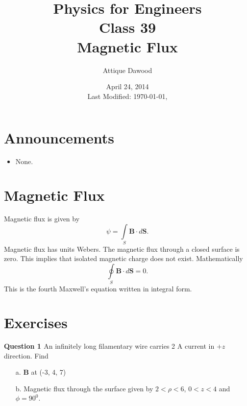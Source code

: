 \documentclass[12pt,a4paper]{article}
\title{\vspace{-3cm}Physics for Engineers\\Class 39\\Magnetic Flux}
\author{Attique Dawood}
\date{April 24, 2014\\[0.2cm] Last Modified: \today, \currenttime}
\begin{document}
\maketitle
\section{Announcements}
\begin{itemize}
\item None.
\end{itemize}
\section{Magnetic Flux}
Magnetic flux is given by
\begin{equation}
\psi=\int\limits_{S}\textbf{B}\cdot d{\textbf{S}}.
\end{equation}
Magnetic flux has units Webers. The magnetic flux through a closed surface is zero. This implies that isolated magnetic charge does not exist. Mathematically
\begin{equation}
\oint\limits_{S}\textbf{B}\cdot d{\textbf{S}}=0.
\end{equation}
This is the fourth Maxwell's equation written in integral form.
\section{Exercises}
\noindent\textbf{Question 1 \cite[Problem 7.21, page 300]{Sadiku}} An infinitely long filamentary wire carries 2 A current in $+z$ direction. Find
\begin{itemize}
\item[a.] \textbf{B} at (-3, 4, 7)
\item[b.] Magnetic flux through the surface given by $2<\rho<6$, $0<z<4$ and $\phi=90^0$.
\end{itemize}


\end{document}
